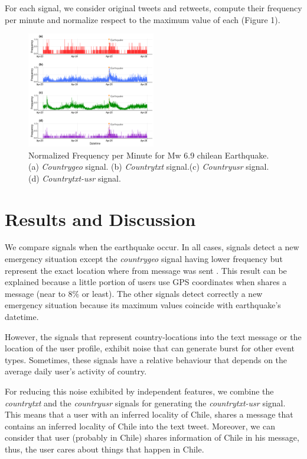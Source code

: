 \documentclass[letterpaper]{article} %
\begin{document}
For each signal, we consider original tweets and retweets, compute their frequency per minute and normalize respect to the maximum value of each (Figure 1).

\begin{figure}[h]
	
	\centering
	\includegraphics[width=0.5\textwidth]{freq_per_minute.png}
	\caption{Normalized Frequency per Minute for Mw 6.9 chilean Earthquake. (a) \textit{Countrygeo} signal. (b) \textit{Countrytxt} signal.(c) \textit{Countryusr} signal. (d) \textit{Countrytxt-usr} signal.}
\end{figure}

\section{Results and Discussion}

We compare signals when the earthquake occur. In all cases, signals detect a new emergency situation except the \textit{countrygeo} signal having lower frequency but represent the exact location where from message was sent . This result can be explained because a little portion of users use GPS coordinates when shares a message (near to $8\%$ or least). The other signals detect correctly a new emergency situation because its maximum values coincide with earthquake's datetime.

However, the signals that represent country-locations into the text message or the location of the user profile, exhibit noise that can generate burst for other event types. Sometimes, these signals have a relative behaviour that depends on the average daily user's activity of country. 

For reducing this noise exhibited by independent features, we combine the \textit{countrytxt} and the \textit{countryusr} signals for generating the \textit{countrytxt-usr} signal. This means that a user with an inferred locality of Chile, shares a message that contains an inferred locality of Chile into the text tweet. Moreover, we can consider that user (probably in Chile) shares information of Chile in his message, thus, the user cares about things that happen in Chile.
\end{document}
